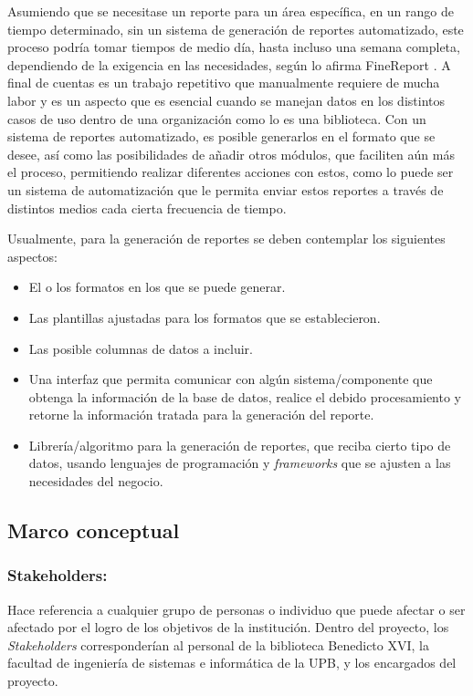 \documentclass[spanish]{ieee_upb}
\begin{document}
\vspace{0.3cm}
Asumiendo que se necesitase un reporte para un área específica, en un rango de tiempo determinado, sin un sistema de generación de reportes automatizado, este proceso podría tomar tiempos de medio día, hasta incluso una semana completa, dependiendo de la exigencia en las necesidades, según lo afirma FineReport \cite{finerep_automatedrep_2024}. A final de cuentas es un trabajo repetitivo que manualmente requiere de mucha labor y es un aspecto que es esencial cuando se manejan datos en los distintos casos de uso dentro de una organización como lo es una biblioteca. Con un sistema de reportes automatizado, es posible generarlos en el formato que se desee, así como las posibilidades de añadir otros módulos, que faciliten aún más el proceso, permitiendo realizar diferentes acciones con estos, como lo puede ser un sistema de automatización que le permita  enviar estos reportes a través de distintos medios cada cierta frecuencia de tiempo.

\vspace{0.3cm}
Usualmente, para la generación de reportes se deben contemplar los siguientes aspectos:

\begin{itemize}
    \item El o los formatos en los que se puede generar.
    \item Las plantillas ajustadas para los formatos que se establecieron.
    \item Las posible columnas de datos a incluir.
    \item Una interfaz que permita comunicar con algún sistema/componente que obtenga la información de la base de datos, realice el debido procesamiento y retorne la información tratada para la generación del reporte.
    \item Librería/algoritmo para la generación de reportes, que reciba cierto tipo de datos, usando lenguajes de programación y \textit{frameworks} que se ajusten a las necesidades del negocio.
\end{itemize}

\subsection{Marco conceptual}

    \subsubsection{Stakeholders:} Hace referencia a cualquier grupo de personas o individuo que puede afectar o ser afectado por el logro de los objetivos de la institución\cite{freeman1984strategic}. Dentro del proyecto, los \textit{Stakeholders} corresponderían al personal de la biblioteca Benedicto XVI, la facultad de ingeniería de sistemas e informática de la UPB, y los encargados del proyecto.  
\end{document}
